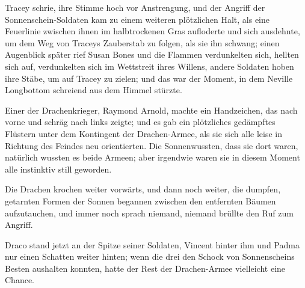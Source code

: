 Tracey schrie, ihre Stimme hoch vor Anstrengung,  und der Angriff der Sonnenschein-Soldaten kam zu einem weiteren plötzlichen Halt, als eine Feuerlinie zwischen ihnen im halbtrockenen Gras aufloderte und sich ausdehnte, um dem Weg von Traceys Zauberstab zu folgen, als sie ihn schwang; einen Augenblick später rief Susan Bones  und die Flammen verdunkelten sich, hellten sich auf, verdunkelten sich im Wettstreit ihres Willens, andere Soldaten hoben ihre Stäbe, um auf Tracey zu zielen; und das war der Moment, in dem Neville Longbottom schreiend aus dem Himmel stürzte.

\later

Einer der Drachenkrieger, Raymond Arnold, machte ein Handzeichen, das nach vorne und schräg nach links zeigte; und es gab ein plötzliches gedämpftes Flüstern unter dem Kontingent der Drachen-Armee, als sie sich alle leise in Richtung des Feindes neu orientierten. Die Sonnenwussten, dass sie dort waren, natürlich wussten es beide Armeen; aber irgendwie waren sie in diesem Moment alle instinktiv still geworden.

Die Drachen krochen weiter vorwärts, und dann noch weiter, die dumpfen, getarnten Formen der Sonnen begannen zwischen den entfernten Bäumen aufzutauchen, und immer noch sprach niemand, niemand brüllte den Ruf zum Angriff.

Draco stand jetzt an der Spitze seiner Soldaten, Vincent hinter ihm und Padma nur einen Schatten weiter hinten; wenn die drei den Schock von Sonnenscheins Besten aushalten konnten, hatte der Rest der Drachen-Armee vielleicht eine Chance.

